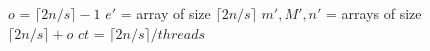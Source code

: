 \begin{figure}[t!]
\begin{minipage}[t]{.50\textwidth}
  \vspace{0pt}
  \begin{algorithm}[H]
\small
  \LinesNumbered
  \SetAlgoNoEnd
  \DontPrintSemicolon
    \BlankLine%
  $o$ = $\lceil 2n/s \rceil-1$\;
  $e'$ = array of size $\lceil 2n/s \rceil$\;
  $m', M', n'$ = arrays of size $\lceil 2n/s \rceil + o$\;
  $ct$ = $\lceil 2n/s \rceil/threads$\;%
\end{algorithm}
\end{minipage}
\end{figure}
